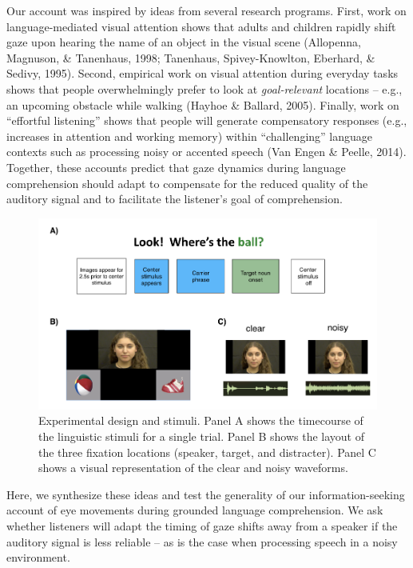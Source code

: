 \documentclass[english,man]{apa6}
\theoremstyle{definition}
\theoremstyle{definition}
\theoremstyle{definition}
\theoremstyle{remark}
\begin{document}
Our account was inspired by ideas from several research programs. First,
work on language-mediated visual attention shows that adults and
children rapidly shift gaze upon hearing the name of an object in the
visual scene (Allopenna, Magnuson, \& Tanenhaus, 1998; Tanenhaus,
Spivey-Knowlton, Eberhard, \& Sedivy, 1995). Second, empirical work on
visual attention during everyday tasks shows that people overwhelmingly
prefer to look at \emph{goal-relevant} locations -- e.g., an upcoming
obstacle while walking (Hayhoe \& Ballard, 2005). Finally, work on
\enquote{effortful listening} shows that people will generate
compensatory responses (e.g., increases in attention and working memory)
within \enquote{challenging} language contexts such as processing noisy
or accented speech (Van Engen \& Peelle, 2014). Together, these accounts
predict that gaze dynamics during language comprehension should adapt to
compensate for the reduced quality of the auditory signal and to
facilitate the listener's goal of comprehension.

\begin{figure}[tb]

{\centering \includegraphics[width=0.8\linewidth]{figs/stimuli-plot-1} 

}

\caption{Experimental design and stimuli. Panel A shows the timecourse of the linguistic stimuli for a single trial. Panel B shows the layout of the three fixation locations (speaker, target, and distracter). Panel C shows a visual representation of the clear and noisy waveforms.}\label{fig:stimuli-plot}
\end{figure}

Here, we synthesize these ideas and test the generality of our
information-seeking account of eye movements during grounded language
comprehension. We ask whether listeners will adapt the timing of gaze
shifts away from a speaker if the auditory signal is less reliable -- as
is the case when processing speech in a noisy environment.
\end{document}
